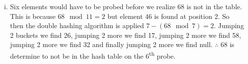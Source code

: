 \documentclass[fleqn, 12pt]{article}
\begin{document}
\begin{enumerate}[a)]
\begin{enumerate}[i)]
    \item Six elements would have to be probed before we realize 68 is not in the table. This is because $68\mod11=2$ but element 46 is found at position 2. So then the double hashing algorithm is applied $7-(68\mod7)=2$. Jumping 2 buckets we find 26, jumping 2 more we find 17, jumping 2 more we find 58, jumping 2 more we find 32 and finally jumping 2 more we find null. $\therefore$ 68 is determine to not be in the hash table on the 6\textsuperscript{th} probe.

    \end{enumerate}
\end{enumerate}
\end{document}
